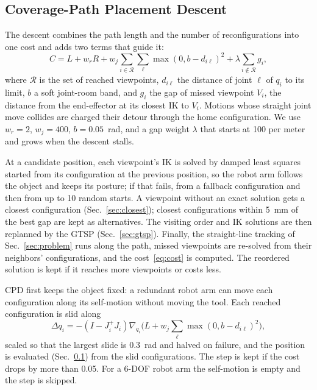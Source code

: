 \documentclass[letterpaper, journal, twoside]{IEEEtran}
\begin{document}
\subsection{Coverage-Path Placement Descent}
\label{sec:evaluate}
The descent combines the path length and the number of reconfigurations into one cost and adds two terms that guide it:
\begin{equation}
C = L + w_r R + w_j \sum_{i \in \mathcal{R}} \sum_{\ell} \max(0, b - d_{i\ell})^2 + \lambda \sum_{i \notin \mathcal{R}} g_i ,
\label{eq:cost}
\end{equation}
where $\mathcal{R}$ is the set of reached viewpoints, $d_{i\ell}$ the distance of joint $\ell$ of $q_i$ to its limit, $b$ a soft joint-room band, and $g_i$ the gap of missed viewpoint $V_i$, the distance from the end-effector at its closest IK to $V_i$. Motions whose straight joint move collides are charged their detour through the home configuration. We use $w_r = 2$, $w_j = 400$, $b = 0.05$~rad, and a gap weight $\lambda$ that starts at 100 per meter and grows when the descent stalls.

At a candidate position, each viewpoint's IK is solved by damped least squares started from its configuration at the previous position, so the robot arm follows the object and keeps its posture; if that fails, from a fallback configuration and then from up to 10 random starts. A viewpoint without an exact solution gets a closest configuration (Sec.~\ref{sec:closest}); closest configurations within 5~mm of the best gap are kept as alternatives. The visiting order and IK solutions are then replanned by the GTSP (Sec.~\ref{sec:gtsp}). Finally, the straight-line tracking of Sec.~\ref{sec:problem} runs along the path, missed viewpoints are re-solved from their neighbors' configurations, and the cost~\eqref{eq:cost} is computed. The reordered solution is kept if it reaches more viewpoints or costs less.

CPD first keeps the object fixed: a redundant robot arm can move each configuration along its self-motion without moving the tool. Each reached configuration is slid along
\begin{equation}
\Delta q_i = -\left(I - J_i^{+} J_i\right) \nabla_{q_i}\!\Big(L + w_j \sum_\ell \max(0, b - d_{i\ell})^2\Big),
\end{equation}
scaled so that the largest slide is 0.3~rad and halved on failure, and the position is evaluated (Sec.~\ref{sec:evaluate}) from the slid configurations. The step is kept if the cost drops by more than 0.05. For a 6-DOF robot arm the self-motion is empty and the step is skipped.
\end{document}
